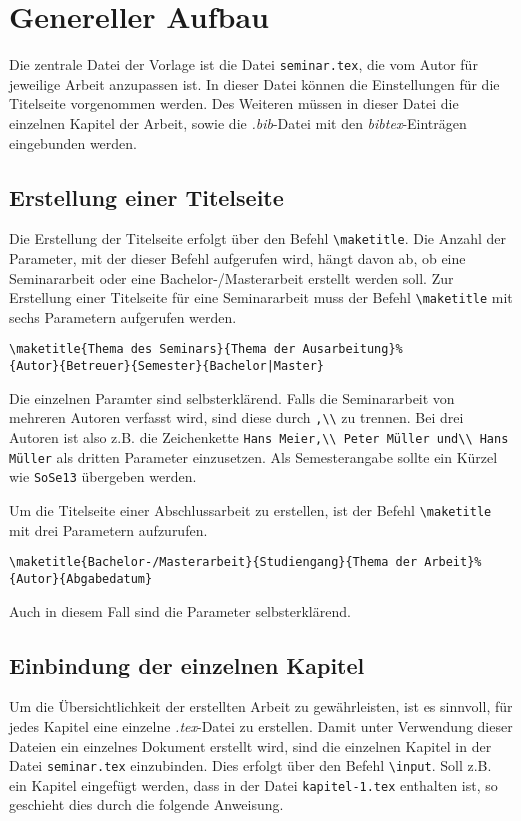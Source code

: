 %
\section{Genereller Aufbau}
%
Die zentrale Datei der Vorlage ist die Datei \texttt{seminar.tex}, die vom Autor für jeweilige Arbeit
anzupassen ist. In dieser Datei können die Einstellungen für die Titelseite vorgenommen
werden. Des Weiteren müssen in dieser Datei die einzelnen Kapitel der Arbeit, sowie die
\textit{.bib}-Datei mit den \textit{bibtex}-Einträgen eingebunden werden.
%
\subsection{Erstellung einer Titelseite}
%
Die Erstellung der Titelseite erfolgt über den Befehl \texttt{\textbackslash maketitle}. Die Anzahl der Parameter,
mit der dieser Befehl aufgerufen wird, hängt davon ab, ob eine Seminararbeit oder
eine Bachelor-/Masterarbeit erstellt werden soll.
Zur Erstellung einer Titelseite für eine Seminararbeit muss der Befehl \texttt{\textbackslash maketitle} mit
sechs Parametern aufgerufen werden.
%
\begin{verbatim}
\maketitle{Thema des Seminars}{Thema der Ausarbeitung}%
{Autor}{Betreuer}{Semester}{Bachelor|Master}
\end{verbatim}
%
Die einzelnen Paramter sind selbsterklärend. Falls die Seminararbeit von mehreren Autoren
verfasst wird, sind diese durch \texttt{,\textbackslash\textbackslash} zu trennen. Bei drei Autoren ist also z.B. die
Zeichenkette \texttt{Hans Meier,\textbackslash\textbackslash\ Peter Müller und\textbackslash\textbackslash\ Hans Müller} als dritten Parameter
einzusetzen. Als Semesterangabe sollte ein Kürzel wie \texttt{SoSe13} übergeben werden.

Um die Titelseite einer Abschlussarbeit zu erstellen, ist der Befehl \texttt{\textbackslash maketitle} mit drei
Parametern aufzurufen.
%
\begin{verbatim}
\maketitle{Bachelor-/Masterarbeit}{Studiengang}{Thema der Arbeit}%
{Autor}{Abgabedatum}
\end{verbatim}
%
Auch in diesem Fall sind die Parameter selbsterklärend.
%
\subsection{Einbindung der einzelnen Kapitel}
%
Um die Übersichtlichkeit der erstellten Arbeit zu gewährleisten, ist es sinnvoll, für jedes
Kapitel eine einzelne \textit{.tex}-Datei zu erstellen. 
Damit unter Verwendung dieser Dateien ein einzelnes Dokument erstellt wird, sind die einzelnen Kapitel in der Datei \texttt{seminar.tex}
einzubinden. Dies erfolgt über den Befehl \texttt{\textbackslash input}. Soll z.B. ein Kapitel eingefügt werden,
dass in der Datei \texttt{kapitel-1.tex} enthalten ist, so geschieht dies durch die folgende
Anweisung.

